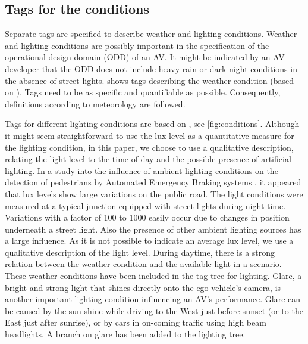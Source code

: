 

\subsection{Tags for the conditions}
\label{sec:conditions}

Separate tags are specified to describe weather and lighting conditions. Weather and lighting conditions are possibly important in the specification of the operational design domain (ODD) of an AV. It might be indicated by an AV developer that the ODD does not include heavy rain or dark night conditions in the absence of street lights.  shows tags describing the weather condition (based on \cite{mahmassani2012use}). Tags need to be as specific and quantifiable as possible. Consequently, definitions according to meteorology are followed. 

Tags for different lighting conditions are based on \cite{golob2003relationships}, see \cref{fig:conditions}. Although it might seem straightforward to use the lux level as a quantitative measure for the lighting condition, in this paper, we choose to use a qualitative description, relating the light level to the time of day and the possible presence of artificial lighting. In a study into the influence of ambient lighting conditions on the detection of pedestrians by Automated Emergency Braking systems \autocite{wouters2013influence}, it appeared that lux levels show large variations on the public road. 
The light conditions were measured at a typical junction equipped with street lights during night time. Variations with a factor of 100 to 1000 easily occur due to changes in position underneath a street light. 
Also the presence of other ambient lighting sources has a large influence. As it is not possible to indicate an average lux level, we use a qualitative description of the light level. 
During daytime, there is a strong relation between the weather condition and the available light in a scenario. These weather conditions have been included in the tag tree for lighting.
Glare, a bright and strong light that shines directly onto the ego-vehicle's camera, is another important lighting condition influencing an AV's performance. Glare can be caused by the sun shine while driving to the West just before sunset (or to the East just after sunrise), or by cars in on-coming traffic using high beam headlights. A branch on glare has been added to the lighting tree.  
